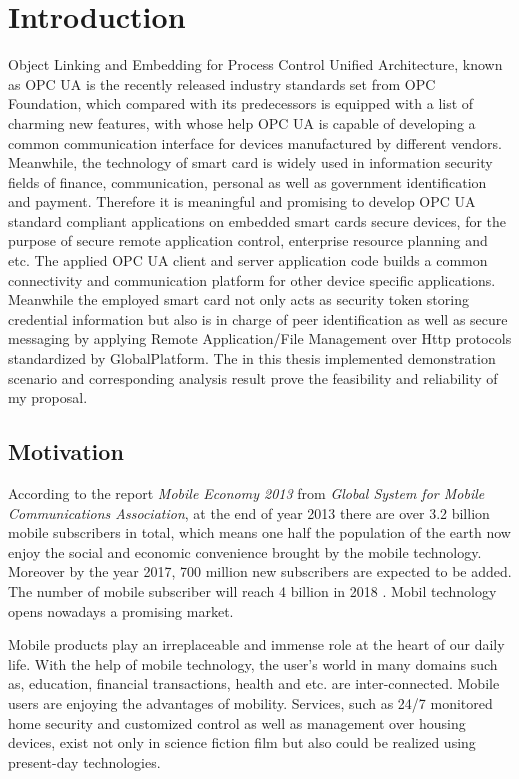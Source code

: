 \chapter{Introduction}\label{secIntroduction}

Object Linking and Embedding for Process Control Unified Architecture, known as OPC UA is the recently released industry standards set from OPC Foundation, which compared with its predecessors is equipped with a list of charming new features, with whose help OPC UA is capable of developing a common communication interface for devices manufactured by different vendors. Meanwhile, the technology of smart card is widely used in information security fields of finance, communication, personal as well as government identification and payment. Therefore it is meaningful and promising to develop OPC UA standard compliant applications on embedded smart cards secure devices, for the purpose of secure remote application    control, enterprise resource planning and etc. The applied OPC UA client and server application code builds a common connectivity and communication platform for other device specific applications. Meanwhile the employed smart card not only acts as security token storing credential information but also is in charge of peer identification as well as secure messaging by applying Remote Application/File Management over Http protocols standardized by GlobalPlatform. The in this thesis implemented demonstration scenario and corresponding analysis result prove the feasibility and reliability of my proposal. 

\section{Motivation}\label{secMotivation}

According to the report \emph{Mobile Economy 2013} from \emph{Global System for Mobile Communications Association}, at the end of year 2013 there are over 3.2 billion mobile subscribers in total, which means one half the population of the earth now enjoy the social and economic convenience brought by the mobile technology. Moreover by the year 2017, 700 million new subscribers are expected to be added. The number of mobile subscriber will reach 4 billion in 2018 \cite{last}. Mobil technology opens nowadays a promising market.

Mobile products play an irreplaceable and immense role at the heart of our daily life. With the help of mobile technology, the user's world in many domains such as, education, financial transactions, health and etc. are inter-connected. Mobile users are enjoying the advantages of mobility. Services, such as 24/7 monitored home security and customized control as well as management over housing devices, exist not only in science fiction film but also could be realized using present-day technologies.

